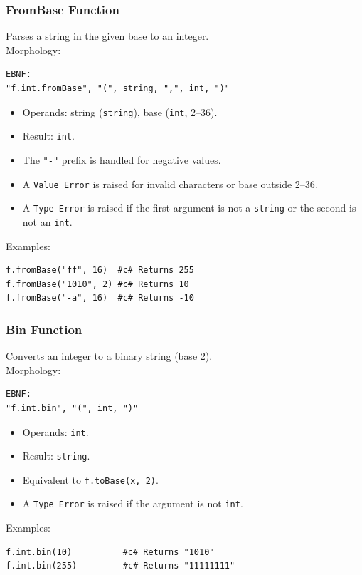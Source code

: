 \subsubsection{FromBase Function}
Parses a string in the given base to an integer. \\
Morphology:
\begin{verbatim}
EBNF:
"f.int.fromBase", "(", string, ",", int, ")"
\end{verbatim}
\begin{itemize}
\item Operands: string (\texttt{string}), base (\texttt{int}, 2--36).
\item Result: \texttt{int}.
\item The \texttt{"-"} prefix is handled for negative values.
\item A \texttt{Value Error} is raised for invalid characters or base outside 2--36.
\item A \texttt{Type Error} is raised if the first argument is not a \texttt{string} or the second is not an \texttt{int}.
\end{itemize}
Examples:
\begin{verbatim}
f.fromBase("ff", 16)  #c# Returns 255
f.fromBase("1010", 2) #c# Returns 10
f.fromBase("-a", 16)  #c# Returns -10
\end{verbatim}

\subsubsection{Bin Function}
Converts an integer to a binary string (base 2). \\
Morphology:
\begin{verbatim}
EBNF:
"f.int.bin", "(", int, ")"
\end{verbatim}
\begin{itemize}
\item Operands: \texttt{int}.
\item Result: \texttt{string}.
\item Equivalent to \texttt{f.toBase(x, 2)}.
\item A \texttt{Type Error} is raised if the argument is not \texttt{int}.
\end{itemize}
Examples:
\begin{verbatim}
f.int.bin(10)          #c# Returns "1010"
f.int.bin(255)         #c# Returns "11111111"
\end{verbatim}

